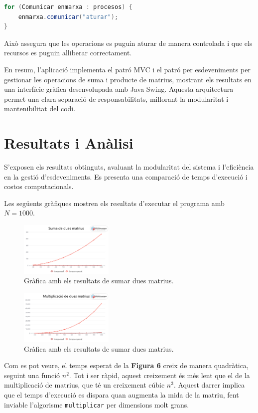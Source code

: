 \documentclass{ieeetj}
\begin{document}
\begin{lstlisting}[language=Java, basicstyle=\ttfamily\normalsize]
for (Comunicar enmarxa : procesos) {
    enmarxa.comunicar("aturar");
}
\end{lstlisting}

Això assegura que les operacions es puguin aturar de manera controlada i que els recursos es puguin alliberar correctament.

En resum, l'aplicació implementa el patró MVC i el patró per esdeveniments per gestionar les operacions de suma i producte de matrius, mostrant els resultats en una interfície gràfica desenvolupada amb Java Swing. Aquesta arquitectura permet una clara separació de responsabilitats, millorant la modularitat i mantenibilitat del codi.

\section{Resultats i Anàlisi}
S'exposen els resultats obtinguts, avaluant la modularitat del sistema i l’eficiència en la gestió d'esdeveniments. Es presenta una comparació de temps d’execució i costos computacionals.

Les següents gràfiques mostren els resultats d'executar el programa amb $N = 1000$.
\begin{figure}[htbp]
\centerline{\includegraphics[width=0.4\textwidth]{Cap1Matrius/docs/png/figuera6.png}}
\caption{Gràfica amb els resultats de sumar dues matrius.}
\label{fig:int2}
\end{figure}

\begin{figure}[htbp]
\centerline{\includegraphics[width=0.4\textwidth]{Cap1Matrius/docs/png/figuera7.png}}
\caption{Gràfica amb els resultats de sumar dues matrius.}
\label{fig:int2}
\end{figure}
Com es pot veure, el temps esperat de la \textbf{Figura 6} creix de manera quadràtica, seguint una funció $n^2$. Tot i ser ràpid, aquest creixement és més lent que el de la multiplicació de matrius, que té un creixement cúbic $n^3$. Aquest darrer implica que el temps d'execució es dispara quan augmenta la mida de la matriu, fent inviable l'algorisme \texttt{multiplicar} per dimensions molt grans.
\end{document}
